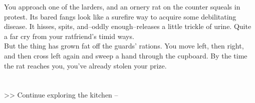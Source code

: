 You approach one of the larders, and an ornery rat on the counter squeals in protest. Its bared fangs look like a surefire way to acquire some debilitating disease. It hisses, spits, and--oddly enough--releases a little trickle of urine. Quite a far cry from your ratfriend’s timid ways.\\

But the thing has grown fat off the guards’ rations. You move left, then right, and then cross left again and sweep a hand through the cupboard. By the time the rat reaches you, you’ve already stolen your prize.\\
\\
\\

>> Continue exploring the kitchen -- 